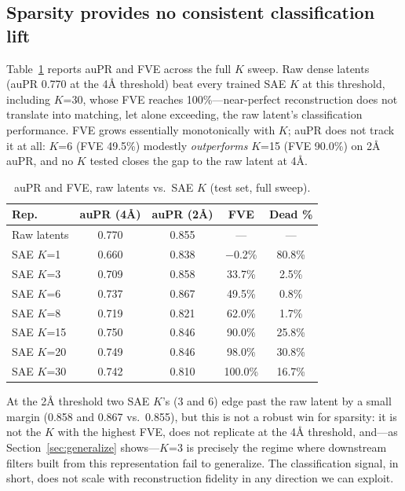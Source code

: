 \documentclass{article}
\begin{document}
\subsection{Sparsity provides no consistent classification lift}

Table~\ref{tab:aupr} reports auPR and FVE across the full $K$ sweep. Raw dense latents (auPR 0.770 at the 4\r{A} threshold) beat every trained SAE $K$ at this threshold, including $K$=30, whose FVE reaches 100\%---near-perfect reconstruction does not translate into matching, let alone exceeding, the raw latent's classification performance. FVE grows essentially monotonically with $K$; auPR does not track it at all: $K$=6 (FVE 49.5\%) modestly \emph{outperforms} $K$=15 (FVE 90.0\%) on 2\r{A} auPR, and no $K$ tested closes the gap to the raw latent at 4\r{A}.

\begin{table}[!ht]
\caption{auPR and FVE, raw latents vs.\ SAE $K$ (test set, full sweep).}
\label{tab:aupr}
\centering
\begin{small}
\begin{tabular}{lcccc}
\toprule
Rep. & auPR (4\r{A}) & auPR (2\r{A}) & FVE & Dead \% \\
\midrule
Raw latents & 0.770 & 0.855 & --- & --- \\
SAE $K$=1  & 0.660 & 0.838 & $-$0.2\% & 80.8\% \\
SAE $K$=3  & 0.709 & 0.858 & 33.7\% & 2.5\% \\
SAE $K$=6  & 0.737 & 0.867 & 49.5\% & 0.8\% \\
SAE $K$=8  & 0.719 & 0.821 & 62.0\% & 1.7\% \\
SAE $K$=15 & 0.750 & 0.846 & 90.0\% & 25.8\% \\
SAE $K$=20 & 0.749 & 0.846 & 98.0\% & 30.8\% \\
SAE $K$=30 & 0.742 & 0.810 & 100.0\% & 16.7\% \\
\bottomrule
\end{tabular}
\end{small}
\end{table}

At the 2\r{A} threshold two SAE $K$'s (3 and 6) edge past the raw latent by a small margin (0.858 and 0.867 vs.\ 0.855), but this is not a robust win for sparsity: it is not the $K$ with the highest FVE, does not replicate at the 4\r{A} threshold, and---as Section~\ref{sec:generalize} shows---$K$=3 is precisely the regime where downstream filters built from this representation fail to generalize. The classification signal, in short, does not scale with reconstruction fidelity in any direction we can exploit.
\end{document}
